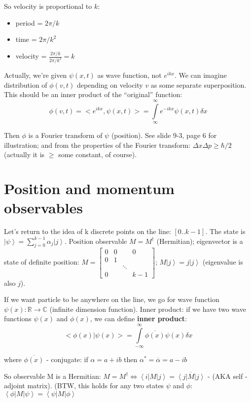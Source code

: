 \documentclass{scrartcl}
\newcommand{\cplx}{\mathbb{C}} %
\newcommand{\bigR}{\mathbb{R}} %
\newcommand{\ket}[1]{\left| #1 \right>} %
\newcommand{\bra}[1]{\left< #1 \right|} %
\begin{document}
So velocity is proportional to $k$:
\begin{itemize}
\item period = $2\pi/k$
\item time = $2\pi/k^2$
\item velocity = $\frac{2\pi/k}{2\pi/k^2} = k$
\end{itemize}


Actually, we're given $\psi(x, t)$ as wave function, not $e^{ikx}$. We can
imagine distribution of $\phi(v, t)$ depending on velocity $v$ as some separate
superposition. This should be an inner product of the ``original'' function:
$$\phi(v, t) = < e^{ikx}, \psi(x, t)> = \int \limits_\infty^\infty e^{-ikx}
\psi(x, t) \delta x$$

Then $\phi$ is a Fourier transform of $\psi$ (position). See slide 9-3, page 6
for illustration; and from the properties of the Fourier transform: $\Delta x
\Delta p \geq \hbar/2$ (actually it is $\geq$ some constant, of course).

\section{Position and momentum observables }
\label{sec:Position_and_momentum_observables}

Let's return to the idea of k discrete points on the line: $[0 .. k-1]$. The
state is $\ket\psi = \sum \limits_{j=0}^{k-1} \alpha_j \ket j$. Position
observable $M = M^\dag$ (Hermitian); eigenvector is a state of definite
position: $M = \left[ \begin{array}{cccc} 0 & 0 & & 0 \\ 0 & 1 & & \\ & & \ddots
    & \\ 0 & & &k- 1 \end{array}\right]$; $M \ket j = j \ket j$ (eigenvalue is
also $j$).

If we want particle to be anywhere on the line, we go for wave function $\psi(x)
: \bigR \to \cplx $ (infinite dimension function).
Inner product: if we have two wave functions $\psi(x)$ and $\phi(x)$, we can
define {\bf inner product}: $$<\phi(x)| \psi(x)> = \int \limits_{-\infty}^\infty
\overline{\phi(x)} \psi(x) \delta x $$

where $\overline{ \phi(x)}$ - conjugate: if $\alpha = a + ib$ then $\alpha^* =
\overline\alpha = a-ib$

So observable M is a Hermitian: $M = M^\dag \Leftrightarrow \bra i M \ket j =
\overline{\bra j M \ket j}$ - (AKA self - adjoint matrix). (BTW, this holds for
any two states $\psi$ and $\phi$: $\bra\phi M \ket\psi = \bra \psi M \ket \phi$
\end{document}
